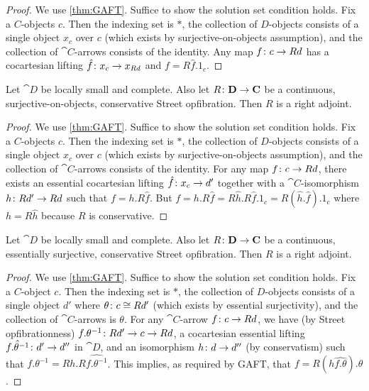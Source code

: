 \begin{proof}
	We use \ref{thm:GAFT}.  Suffice to show the solution set condition holds.  Fix a $ C $-objects $ c $.  Then the indexing set is $ \ast $, the collection of $ D $-objects consists of a single object $ x_c $ over $ c $ (which exists by surjective-on-objects assumption), and the collection of $ \cat{C} $-arrows consists of the identity.  Any map $ f \colon c \to Rd $ has a cocartesian lifting $ \hat{f} \colon x_c \to x_{Rd} $ and $ f = R \hat{f} . 1_c $.
\end{proof}

\begin{thm}
	Let $ \cat{D}$ be locally small and complete. Also let $ R \colon \mathbf{D} \to \mathbf{C} $ be a continuous, surjective-on-objects, conservative Street opfibration.  Then $ R $ is a right adjoint.
\end{thm}

\begin{proof}
	We use \ref{thm:GAFT}.  Suffice to show the solution set condition holds.  Fix a $ C $-objects $ c $.  Then the indexing set is $ \ast $, the collection of $ D $-objects consists of a single object $ x_c $ over $ c $ (which exists by surjective-on-objects assumption), and the collection of $ \cat{C} $-arrows consists of the identity.  For any map $ f \colon c \to Rd $, there exists an essential cocartesian lifting $ \hat{f} \colon x_c \to d' $ together with a $ \cat{C} $-isomorphism $ h \colon Rd' \to Rd $ such that $ f = h . R \hat{f} $. But $ f = h . R \hat{f} = R \hat{h} . R \hat{f} . 1_c = R (\hat{h} . \hat{f}) . 1_c $ where $ h = R \hat{h} $ because $ R $ is conservative.
\end{proof}

\begin{thm}
	Let $ \cat{D}$ be locally small and complete. Also let $ R \colon \mathbf{D} \to \mathbf{C} $ be a continuous, essentially surjective, conservative Street opfibration.  Then $ R $ is a right adjoint.
\end{thm}

\begin{proof}
	We use \ref{thm:GAFT}.  Suffice to show the solution set condition holds.  Fix a $ C $-object $ c $.  Then the indexing set is $ \ast $, the collection of $ D $-objects consists of a single object $ d' $ where $ \theta \colon c \cong Rd' $ (which exists by essential surjectivity), and the collection of $ \cat{C} $-arrows is $ { \theta } $.  For any $ \cat{C} $-arrow $ f \colon c \to Rd $, we have (by Street opfibrationness) $ f . \theta^{-1} \colon Rd' \to c \to Rd $, a cocartesian essential lifting $ \hat{ f . \theta^{-1} } \colon d' \to d'' $ in $ \cat{D} $, and an isomorphism $ h \colon d \to d'' $ (by conservatism) such that $ f . \theta^{-1} = Rh . R \hat{ f . \theta^{-1} } $.  This implies, as required by GAFT, that $ f = R (h\hat{ f . \theta }) . \theta $.
\end{proof}

